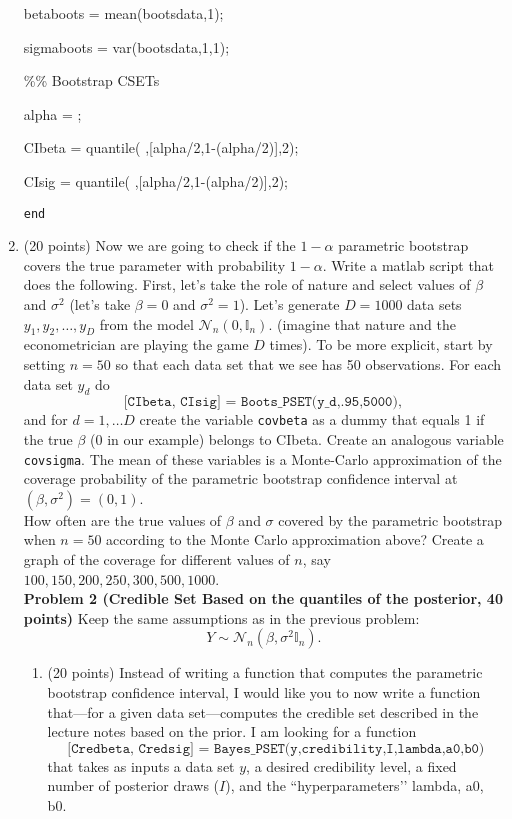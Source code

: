 \documentclass[11pt]{article} %
\begin{document}
\begin{enumerate}
betaboots  = mean(bootsdata,1);

sigmaboots = var(bootsdata,1,1);

\%\% Bootstrap CSETs

alpha  = ;

CIbeta = quantile( ,[alpha/2,1-(alpha/2)],2);

CIsig  = quantile( ,[alpha/2,1-(alpha/2)],2);

\texttt{end}

\item (20 points) Now we are going to check if the $1-\alpha$ parametric bootstrap covers the true parameter with probability $1-\alpha$. Write a matlab script that does the following. First, let’s take the role of nature and select values of $\beta$ and $\sigma^2$ (let’s take $\beta=0$ and $\sigma^2=1$). Let’s generate $D=1000$ data sets $y_1,y_2, \ldots, y_D$ from the model $\mathcal{N}_n(0,\mathbb{I}_n)$. (imagine that nature and the econometrician are playing the game $D$ times). To be more explicit, start by setting $n=50$ so that each data set that we see has 50 observations. For each data set $y_d$ do
\[ \texttt{[CIbeta, CIsig] = Boots\_PSET(y\_d,.95,5000)}, \]
and for $d=1, \ldots D$ create the variable \texttt{covbeta} as a dummy that equals 1 if the true $\beta$ ($0$ in our example) belongs to CIbeta. Create an analogous variable \texttt{covsigma}. The mean of these variables is a Monte-Carlo approximation of the coverage probability of the parametric bootstrap confidence interval at $(\beta,\sigma^2)=(0,1)$. \\

How often are the true values of $\beta$ and $\sigma$ covered by the parametric bootstrap when $n=50$ according to the Monte Carlo approximation above? Create a graph of the coverage for different values of $n$, say $100, 150, 200, 250, 300, 500, 1000$. \\

\noindent \textbf{Problem 2 (Credible Set Based on the quantiles of the posterior, 40 points)}  Keep the same assumptions as in the previous problem:
\[ Y \sim \mathcal{N}_n(\beta, \sigma^2 \mathbb{I}_n). \]

\begin{enumerate}
\item (20 points) Instead of writing a function that computes the parametric bootstrap confidence interval, I would like you to now write a function that---for a given data set---computes the credible set described in the lecture notes based on the prior. I am looking for a function
$$\texttt{[Credbeta, Credsig] = Bayes\_PSET(y,credibility,I,lambda,a0,b0)}$$
that takes as inputs a data set $y$,  a desired credibility level, a fixed number of posterior draws ($I$), and the ``hyperparameters’’ lambda, a0, b0.  


\end{enumerate}
\end{enumerate}
\end{document}
